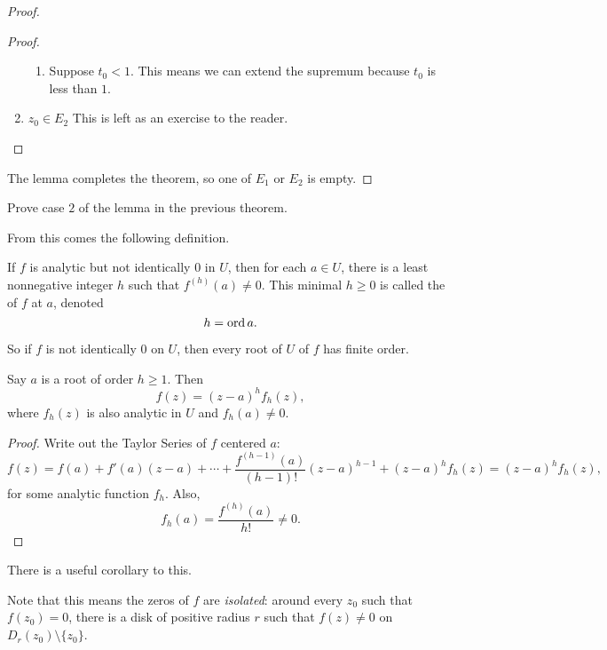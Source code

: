 \documentclass[notes]{subfile}
\begin{document}
\begin{proof}
\begin{proof}
\begin{enumerate}
\begin{enumerate}
                    \item Suppose $t_0 < 1$.
                        This means we can extend the supremum 
                        because $t_0$
                        is less than $1$.
                \end{enumerate}

            \item $z_0 \in E_2$
                This is left as an exercise to the reader.
        \end{enumerate}

    \end{proof}

        The lemma completes the theorem, so one of $E_1$
        or $E_2$ is empty.


\end{proof}

\begin{exercise}
    Prove case $2$ of the lemma in the previous theorem.
\end{exercise}

From this comes the following definition.

\begin{definition}
    If $f$ is analytic but not identically $0$ in $U$, 
    then for each $a \in U$, there is a least nonnegative
    integer $h$ such that $f^{(h)}(a) \ne 0$.
    This minimal $h \ge 0$ is called the  of $f$ at $a$, denoted
    \[ h = \operatorname{ord}{a}. \]
\end{definition}

So if $f$ is not identically $0$ on $U$, then every
root of $U$ of $f$ has finite order.

\begin{theorem}
    Say $a$ is a root of order $h \ge 1$.
    Then
    \[ f(z) = (z-a)^h f_h(z), \]
    where $f_h(z)$ is also analytic in $U$ and
    $f_h(a) \ne 0$.
\end{theorem}

\begin{proof}
    Write out the Taylor Series of $f$ centered $a$:
    \[ f(z) = f(a) + f'(a)(z-a) + \cdots + \frac{f^{(h-1)}(a)}{(h-1)!} (z-a)^{h-1} + (z-a)^h f_h(z)
        = (z-a)^h f_h(z),
    \]
    for some analytic function $f_h$.
    Also,
    \[ f_h(a) = \frac{f^{(h)}(a)}{h!} \ne 0. \]
\end{proof}

There is a useful corollary to this.

\begin{cor}
    Note that this means the zeros of $f$ are \textit{isolated}:
    around every $z_0$ such that $f(z_0) = 0$, there is a disk
    of positive radius $r$ such that $f(z) \ne 0$ on
    $D_r(z_0) \setminus \{ z_0 \}$.
\end{cor}
\end{document}
